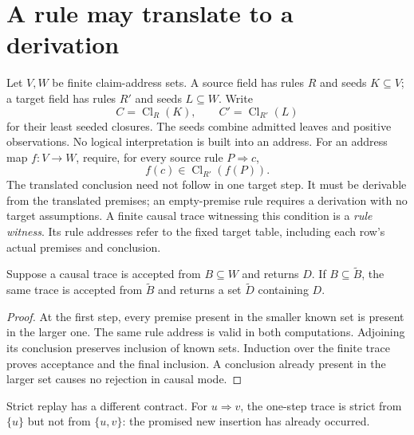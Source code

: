 \section{A rule may translate to a derivation}
Let $V,W$ be finite claim-address sets. A source field has rules $R$ and seeds $K\subseteq V$; a target field has rules $R'$ and seeds $L\subseteq W$. Write
\[
C=\operatorname{Cl}_{R}(K),\qquad C'=\operatorname{Cl}_{R'}(L)
\]
for their least seeded closures. The seeds combine admitted leaves and positive observations. No logical interpretation is built into an address.
For an address map $f:V\to W$, require, for every source rule $P\Rightarrow c$,
\begin{equation}\label{Core:integration:rule-transport}
f(c)\in\operatorname{Cl}_{R'}(f(P)).
\end{equation}
The translated conclusion need not follow in one target step. It must be derivable from the translated premises; an empty-premise rule requires a derivation with no target assumptions. A finite causal trace witnessing this condition is a \emph{rule witness}. Its rule addresses refer to the fixed target table, including each row's actual premises and conclusion.

\begin{Corelemma}\label{Core:integration:stronger-premises}
Suppose a causal trace is accepted from $B\subseteq W$ and returns $D$. If $B\subseteq\widetilde B$, the same trace is accepted from $\widetilde B$ and returns a set $\widetilde D$ containing $D$.
\end{Corelemma}
\begin{proof}
At the first step, every premise present in the smaller known set is present in the larger one. The same rule address is valid in both computations. Adjoining its conclusion preserves inclusion of known sets. Induction over the finite trace proves acceptance and the final inclusion. A conclusion already present in the larger set causes no rejection in causal mode.
\end{proof}
Strict replay has a different contract. For $u\Rightarrow v$, the one-step trace is strict from $\{u\}$ but not from $\{u,v\}$: the promised new insertion has already occurred.

